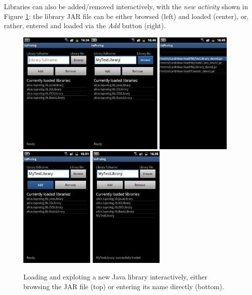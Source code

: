 Libraries can also be added/removed interactively, with the \textit{new activity} shown in Figure \ref{fig:android10}: the library JAR file can be either browsed (left) and loaded (center), or, rather, entered and loaded via the \textit{Add} button (right).
%
\begin{figure}
\centering
  \includegraphics[height=230px]{images/android9b.png}\includegraphics[height=230px]{images/android10.png}
  \includegraphics[height=230px]{images/android11.png}
  \caption{Loading and exploting a new Java library interactively, either browsing the JAR file (top) or entering its name directly (bottom).}\label{fig:android10}
\end{figure}
